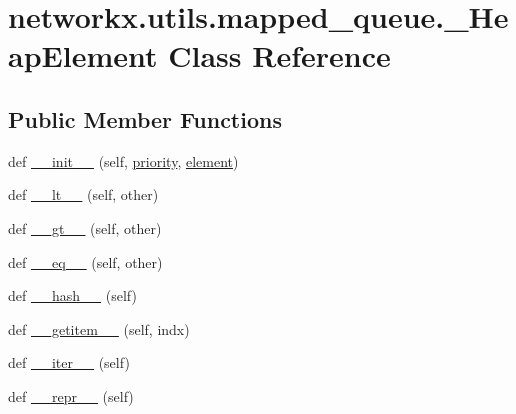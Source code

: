 \hypertarget{classnetworkx_1_1utils_1_1mapped__queue_1_1__HeapElement}{}\section{networkx.\+utils.\+mapped\+\_\+queue.\+\_\+\+Heap\+Element Class Reference}
\label{classnetworkx_1_1utils_1_1mapped__queue_1_1__HeapElement}
\subsection*{Public Member Functions}
\begin{DoxyCompactItemize}
\item 
def \hyperlink{classnetworkx_1_1utils_1_1mapped__queue_1_1__HeapElement_a8b6cde8ccbc44a76f73bab76eac6b6ee}{\+\_\+\+\_\+init\+\_\+\+\_\+} (self, \hyperlink{classnetworkx_1_1utils_1_1mapped__queue_1_1__HeapElement_ae7a91aff4e379dbdee68da8d797fdc89}{priority}, \hyperlink{classnetworkx_1_1utils_1_1mapped__queue_1_1__HeapElement_a02d1ece42ec5e7458bec0337c766bb24}{element})
\item 
def \hyperlink{classnetworkx_1_1utils_1_1mapped__queue_1_1__HeapElement_a1d3f10e1738a9700b514d1f4f7a79f4e}{\+\_\+\+\_\+lt\+\_\+\+\_\+} (self, other)
\item 
def \hyperlink{classnetworkx_1_1utils_1_1mapped__queue_1_1__HeapElement_af283047ac1c65fcad3884453c8f1d271}{\+\_\+\+\_\+gt\+\_\+\+\_\+} (self, other)
\item 
def \hyperlink{classnetworkx_1_1utils_1_1mapped__queue_1_1__HeapElement_ae1ed41594dc4c46efbbd8b6b92cbbe14}{\+\_\+\+\_\+eq\+\_\+\+\_\+} (self, other)
\item 
def \hyperlink{classnetworkx_1_1utils_1_1mapped__queue_1_1__HeapElement_ab9d4fc76614c4d17590db986e3881d33}{\+\_\+\+\_\+hash\+\_\+\+\_\+} (self)
\item 
def \hyperlink{classnetworkx_1_1utils_1_1mapped__queue_1_1__HeapElement_a5e5ff987fb520508c36df6d47094d08f}{\+\_\+\+\_\+getitem\+\_\+\+\_\+} (self, indx)
\item 
def \hyperlink{classnetworkx_1_1utils_1_1mapped__queue_1_1__HeapElement_a1c387129238489848f909b9e106093a6}{\+\_\+\+\_\+iter\+\_\+\+\_\+} (self)
\item 
def \hyperlink{classnetworkx_1_1utils_1_1mapped__queue_1_1__HeapElement_a0978152fbc6f98ebdc291b4902f82f34}{\+\_\+\+\_\+repr\+\_\+\+\_\+} (self)
\end{DoxyCompactItemize}
